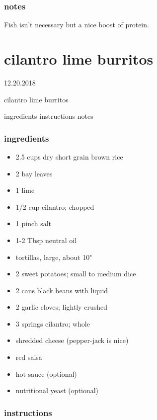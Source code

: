 \documentclass[]{book}
\providecommand{\tightlist}{%
  \setlength{\itemsep}{0pt}\setlength{\parskip}{0pt}}
\begin{document}
\hypertarget{notes-10}{%
\subsection{notes}\label{notes-10}}

Fish isn't necessary but a nice boost of protein.

\hypertarget{cilantro-lime-burritos}{%
\chapter{cilantro lime burritos}\label{cilantro-lime-burritos}}

12.20.2018

cilantro lime burritos

ingredients \textbar{}
instructions \textbar{}
notes

\hypertarget{ingredients-11}{%
\subsection{ingredients}\label{ingredients-11}}

\begin{itemize}
\tightlist
\item
  2.5 cups dry short grain brown rice
\item
  2 bay leaves
\item
  1 lime
\item
  1/2 cup cilantro; chopped
\item
  1 pinch salt
\item
  1-2 Tbsp neutral oil
\item
  tortillas, large, about 10"
\item
  2 sweet potatoes; small to medium dice
\item
  2 cans black beans with liquid
\item
  2 garlic cloves; lightly crushed
\item
  3 springs cilantro; whole
\item
  shredded cheese (pepper-jack is nice)
\item
  red salsa
\item
  hot sauce (optional)
\item
  nutritional yeast (optional)
\end{itemize}

\hypertarget{instructions-11}{%
\subsection{instructions}\label{instructions-11}}
\end{document}
